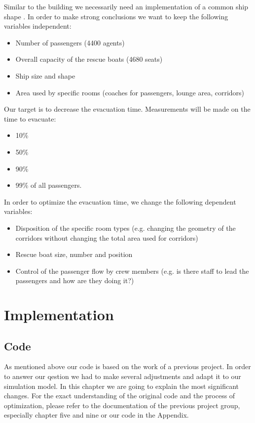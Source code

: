 \documentclass[11pt]{article}
\begin{document}
Similar to the building we necessarily need an  implementation of a common ship shape \cite{shipdecks}. In order to make strong conclusions we want to keep the following variables independent:
\begin{itemize}
\item Number of passengers (4400 agents)
\item Overall capacity of the rescue boats (4680 seats)
\item Ship size and shape
\item Area used by specific rooms (coaches for passengers, lounge area, corridors)
\end{itemize}
Our target is to decrease the evacuation time. Measurements will be made on the time to evacuate:
\begin{itemize}
\item 10\%
\item 50\%
\item 90\%
\item 99\% of all passengers.
\end{itemize}
In order to optimize the evacuation time, we change the following dependent variables:
\begin{itemize}
\item Disposition of the specific room types (e.g. changing the geometry of the corridors without changing the total area used for corridors)
\item Rescue boat size, number and position
\item Control of the passenger flow by crew members (e.g. is there staff to lead the passengers and how are they doing it?)
\end{itemize}




\section{Implementation}
\subsection{Code}
As mentioned above our code is based on the work of a previous project. In order to answer our qestion we had to make several adjustments and adapt it to our simulation model. In this chapter we are going to explain the most significant changes. For the exact understanding of the original code and the process of optimization, please refer to the documentation of the previous project group, especially chapter five and nine\cite{Building} or our code in the Appendix.
\end{document}
